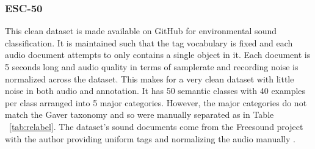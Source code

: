 \subsubsection{ESC-50}
This clean dataset is made available on GitHub for environmental sound classification. It is maintained such that the tag vocabulary is fixed and each audio document attempts to only contains a single object in it. Each document is 5 seconds long and audio quality in terms of samplerate and recording noise is normalized across the dataset. This makes for a very clean dataset with little noise in both audio and annotation. It has 50 semantic classes with 40 examples per class arranged into 5 major categories. However, the major categories do not match the Gaver taxonomy and so were manually separated as in Table ~\ref{tab:relabel}. The dataset's sound documents come from the Freesound project with the author providing uniform tags and normalizing the audio manually \cite{Font2013}.

